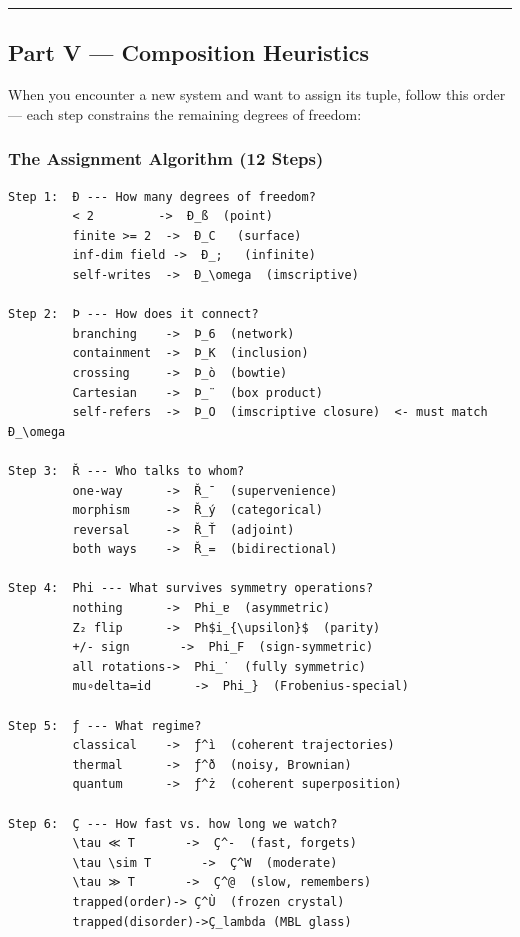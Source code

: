 \documentclass[12pt,a4paper]{article}
\begin{document}
\begin{center}
\rule{0.5\textwidth}{0.4pt}
\end{center}

\subsection{Part V --- Composition Heuristics}

When you encounter a new system and want to assign its tuple, follow this order --- each step constrains the remaining degrees of freedom:

\subsubsection{The Assignment Algorithm (12 Steps)}

\begin{lstlisting}
Step 1:  Ð --- How many degrees of freedom?
         < 2         ->  Ð_ß  (point)
         finite >= 2  ->  Ð_C   (surface)
         inf-dim field ->  Ð_;   (infinite)
         self-writes  ->  Ð_\omega  (imscriptive)

Step 2:  Þ --- How does it connect?
         branching    ->  Þ_6  (network)
         containment  ->  Þ_K  (inclusion)
         crossing     ->  Þ_ò  (bowtie)
         Cartesian    ->  Þ_¨  (box product)
         self-refers  ->  Þ_O  (imscriptive closure)  <- must match Ð_\omega

Step 3:  Ř --- Who talks to whom?
         one-way      ->  Ř_¯  (supervenience)
         morphism     ->  Ř_ý  (categorical)
         reversal     ->  Ř_Ť  (adjoint)
         both ways    ->  Ř_=  (bidirectional)

Step 4:  Phi --- What survives symmetry operations?
         nothing      ->  Phi_ɐ  (asymmetric)
         Z₂ flip      ->  Ph$i_{\upsilon}$  (parity)
         +/- sign       ->  Phi_F  (sign-symmetric)
         all rotations->  Phi_˙  (fully symmetric)
         mu∘delta=id      ->  Phi_}  (Frobenius-special)

Step 5:  ƒ --- What regime?
         classical    ->  ƒ^ì  (coherent trajectories)
         thermal      ->  ƒ^ð  (noisy, Brownian)
         quantum      ->  ƒ^ż  (coherent superposition)

Step 6:  Ç --- How fast vs. how long we watch?
         \tau ≪ T       ->  Ç^-  (fast, forgets)
         \tau \sim T       ->  Ç^W  (moderate)
         \tau ≫ T       ->  Ç^@  (slow, remembers)
         trapped(order)-> Ç^Ù  (frozen crystal)
         trapped(disorder)->Ç_lambda (MBL glass)


\end{lstlisting}
\end{document}
